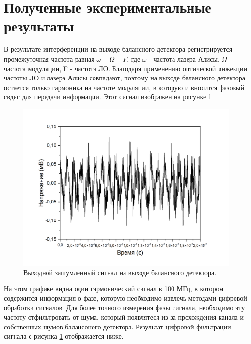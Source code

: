 \section{Полученные экспериментальные результаты}\label{sec:ch2/sect6}

В результате интерференции на выходе балансного детектора регистрируется промежуточная частота  равная $\omega + \Omega - F$, где $\omega$ - частота лазера Алисы, $\Omega$ - частота модуляции, F - частота ЛО. Благодаря применению оптической инжекции частоты ЛО и лазера Алисы совпадают, поэтому на выходе балансного детектора остается только гармоника на частоте модуляции, в которую и вносится фазовый свдиг для передачи информации. Этот сигнал изображен на рисунке \ref{fig:100 MHZ filt ch2}
\begin{figure}
    \centering
    \includegraphics[width=\linewidth]{images/сигнал после бд с новыми шкалами.png}
    \caption{Выходной зашумленный сигнал на выходе балансного детектора.}
    \label{fig:100 MHZ filt ch2}
\end{figure}
На этом графике видна один гармонический сигнал в 100 МГц, в котором содержится информация о фазе, которую необходимо извлечь методами цифровой обработки сигналов. Для более точного измерения фазы сигнала, необходимо эту частоту отфильтровать от шума, который появлятеся из-за прохождения канала и собственных шумов балансоного детектора. Результат цифровой фильтрации сигнала с рисунка  \ref{fig:100 MHZ filt ch2} отображается ниже. 

